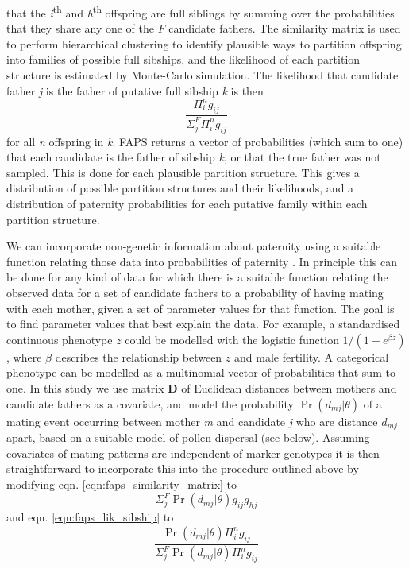 \documentclass[10pt, a4paper, twocolumn]{article} %
\begin{document}
that the \textit{i}\textsuperscript{th} and \textit{h}\textsuperscript{th} offspring are full siblings by summing over the probabilities that they share any one of the $F$ candidate fathers. The similarity matrix is used to perform hierarchical clustering to identify plausible ways to partition offspring into families of possible full sibships, and the likelihood of each partition structure is estimated by Monte-Carlo simulation. The likelihood that candidate father \textit{j} is the father of putative full sibship \textit{k} is then
\begin{equation}\label{eqn:faps_lik_sibship}
\frac{
    \Pi_i^n g_{ij}
    }{
    \Sigma_j^F\Pi_i^n g_{ij}
    }
\end{equation}
for all \textit{n} offspring in \textit{k}. FAPS returns a vector of probabilities (which sum to one) that each candidate is the father of sibship \textit{k}, or that the true father was not sampled. This is done for each plausible partition structure. This gives a distribution of possible partition structures and their likelihoods, and a distribution of paternity probabilities for each putative family within each partition structure.

We can incorporate non-genetic information about paternity using a suitable function relating those data into probabilities of paternity \citep{hadfield2006towards}.
In principle this can be done for any kind of data for which there is a suitable function relating the observed data for a set of candidate fathers to a probability of having mating with each mother, given a set of parameter values for that function. The goal is to find parameter values that best explain the data. For example, a standardised continuous phenotype $z$ could be modelled with the logistic function $1/(1+e^{\beta z})$, where $\beta$ describes the relationship between $z$ and male fertility.
A categorical phenotype can be modelled as a multinomial vector of probabilities that sum to one.
In this study we use matrix \textbf{D} of Euclidean distances between mothers and candidate fathers as a covariate, and model the probability $\Pr(d_{mj}|\theta)$ of a mating event occurring between mother \textit{m} and candidate \textit{j} who are distance $d_{mj}$ apart, based on a suitable model of pollen dispersal (see below).
Assuming covariates of mating patterns are independent of marker genotypes it is then straightforward to incorporate this into the procedure outlined above by modifying eqn. \ref{eqn:faps_similarity_matrix} to
\begin{equation}\label{eqn:pairwise_with_covariates}
\Sigma_j^F \Pr(d_{mj} | \theta)g_{ij}g_{hj}
\end{equation}
and eqn. \ref{eqn:faps_lik_sibship} to
\begin{equation}
\label{sibship_with_covariates}
\frac{
    \Pr(d_{mj} | \theta)\Pi_i^n g_{ij}
    }{
    \Sigma_j^F \Pr(d_{mj} | \theta)\Pi_i^n g_{ij}
    }
\end{equation}
\end{document}

